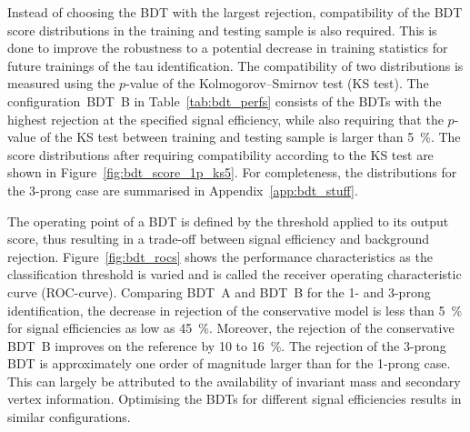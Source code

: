 Instead of choosing the BDT with the largest rejection, compatibility of the BDT
score distributions in the training and testing sample is also required. This is
done to improve the robustness to a potential decrease in training statistics
for future trainings of the tau identification. The compatibility of two
distributions is measured using the $p$-value of the Kolmogorov--Smirnov test
(KS test). The configuration~\mbox{BDT B} in Table~\ref{tab:bdt_perfs} consists
of the BDTs with the highest rejection at the specified signal efficiency, while
also requiring that the $p$-value of the KS test between training and testing
sample is larger than \SI{5}{\percent}. The score distributions after requiring
compatibility according to the KS test are shown in
Figure~\ref{fig:bdt_score_1p_ks5}. For completeness, the distributions for the
3-prong case are summarised in Appendix~\ref{app:bdt_stuff}.

The operating point of a BDT is defined by the threshold applied to its output
score, thus resulting in a trade-off between signal efficiency and background
rejection. Figure~\ref{fig:bdt_rocs} shows the performance characteristics as
the classification threshold is varied and is called the receiver operating
characteristic curve (ROC-curve). Comparing \mbox{BDT A} and \mbox{BDT B} for
the 1- and 3-prong identification, the decrease in rejection of the conservative
model is less than \SI{5}{\percent} for signal efficiencies as low as
\SI{45}{\percent}. Moreover, the rejection of the conservative \mbox{BDT B}
improves on the reference by \num{10} to \SI{16}{\percent}. The rejection of the
3-prong BDT is approximately one order of magnitude larger than for the 1-prong
case. This can largely be attributed to the availability of invariant mass and
secondary vertex information. Optimising the BDTs for different signal
efficiencies results in similar configurations.


